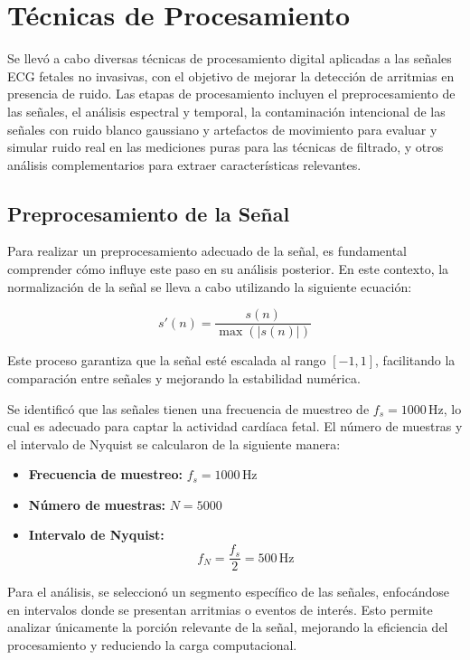 \documentclass[10pt, conference]{IEEEtran}
\begin{document}
\section{Técnicas de Procesamiento}


Se llevó a cabo diversas técnicas de procesamiento digital aplicadas a las señales ECG fetales no invasivas, con el objetivo de mejorar la detección de arritmias en presencia de ruido. Las etapas de procesamiento incluyen el preprocesamiento de las señales, el análisis espectral y temporal, la contaminación intencional de las señales con ruido blanco gaussiano y artefactos de movimiento para evaluar y simular ruido real en las mediciones puras para las técnicas de filtrado, y otros análisis complementarios para extraer características relevantes.

\subsection{Preprocesamiento de la Señal}

Para realizar un preprocesamiento adecuado de la señal, es fundamental comprender cómo influye este paso en su análisis posterior. En este contexto, la normalización de la señal se lleva a cabo utilizando la siguiente ecuación:

\[
s'(n) = \frac{s(n)}{\max(|s(n)|)}
\]

Este proceso garantiza que la señal esté escalada al rango \([-1, 1]\), facilitando la comparación entre señales y mejorando la estabilidad numérica.

Se identificó que las señales tienen una frecuencia de muestreo de \( f_s = 1000 \, \text{Hz} \), lo cual es adecuado para captar la actividad cardíaca fetal. El número de muestras y el intervalo de Nyquist se calcularon de la siguiente manera:

\begin{itemize}
    \item \textbf{Frecuencia de muestreo:} \( f_s = 1000 \, \text{Hz} \)
    \item \textbf{Número de muestras:} \( N = 5000 \)
    \item \textbf{Intervalo de Nyquist:} 
    \[
    f_N = \frac{f_s}{2} = 500 \, \text{Hz}
    \]
\end{itemize}

Para el análisis, se seleccionó un segmento específico de las señales, enfocándose en intervalos donde se presentan arritmias o eventos de interés. Esto permite analizar únicamente la porción relevante de la señal, mejorando la eficiencia del procesamiento y reduciendo la carga computacional.
\end{document}
